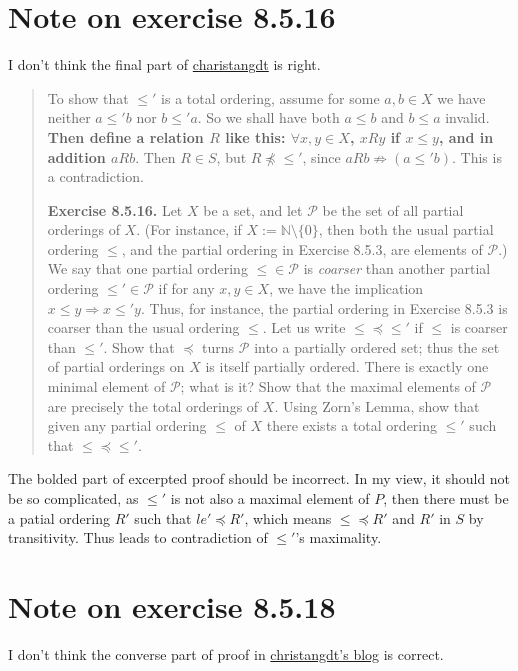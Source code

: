 \documentclass{article}
\begin{document}
\section{Note on exercise 8.5.16}
I don't think the final part of
\href{https://christangdt.home.blog/2019/09/19/%e9%99%b6%e5%93%b2%e8%bd%a9%e5%ae%9e%e5%88%86%e6%9e%908-5%e5%8f%8a%e4%b9%a0%e9%a2%98-analysis-i-8-5-part-2/}{charistangdt}
is right.
\begin{quotation}
    To show that $\leq '$ is a total ordering, assume for some $a, b \in X$ we have
    neither $a \leq ' b$ nor $b \leq ' a$. So we shall have both $a \leq b$ and
    $b \leq a$ invalid. \textbf{Then define a relation $R$ like this:
        $\forall x, y \in X$, $xRy$ if $x \leq y$, and in addition $aRb$}. Then
    $R \in S$, but $R \not\preceq \leq '$, since $aRb \not\Rightarrow (a \leq ' b)$.
    This is a contradiction.

    \textbf{Exercise 8.5.16.} Let $X$ be a set, and let $\mathcal{P}$ be the set of all
    partial orderings of $X$. (For instance, if $X := \mathbb{N} \setminus \{0\}$, then
    both the usual partial ordering $\leq$, and the partial ordering in Exercise 8.5.3,
    are elements of $\mathcal{P}$.)
    We say that one partial ordering $\leq \in \mathcal{P}$ is \textit{coarser} than
    another partial ordering $\leq ' \in \mathcal{P}$ if for any $x, y \in X$, we have
    the implication $x \leq y \Rightarrow x \leq ' y$. Thus, for instance, the partial
    ordering in Exercise 8.5.3 is coarser than the usual ordering $\leq$.
    Let us write $\leq \preceq \leq '$ if $\leq$ is coarser than $\leq '$.
    Show that $\preceq$ turns $\mathcal{P}$ into a partially ordered set; thus the set
    of partial orderings on $X$ is itself partially ordered.
    There is exactly one minimal element of $\mathcal{P}$; what is it? Show that the
    maximal elements of $\mathcal{P}$ are precisely the total orderings of $X$. Using
    Zorn's Lemma, show that given any partial ordering $\leq$ of $X$ there exists a
    total ordering $\leq '$ such that $\leq \preceq \leq '$.
\end{quotation}

The bolded part of excerpted proof should be incorrect.
In my view, it should not be so complicated, as $\le'$ is not also a maximal element
of $P$, then there must be a patial ordering $R'$ such that $le'\preceq R'$, which means
$\le\preceq R'$ and $R'$ in $S$ by transitivity. Thus leads to contradiction of $\le'$'s
maximality.


\section{Note on exercise 8.5.18}
I don't think the converse part of proof in
\href{https://christangdt.home.blog/2019/09/19/%e9%99%b6%e5%93%b2%e8%bd%a9%e5%ae%9e%e5%88%86%e6%9e%908-5%e5%8f%8a%e4%b9%a0%e9%a2%98-analysis-i-8-5-part-2/}{christangdt's blog}
is correct.
\end{document}
